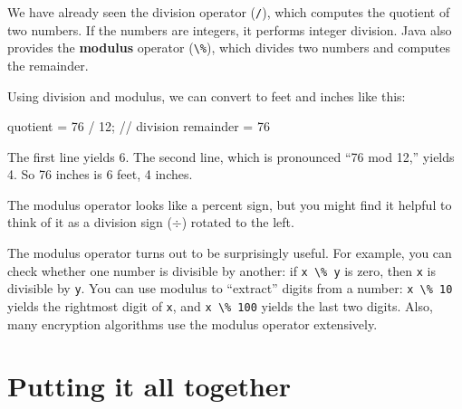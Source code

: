 \documentclass[12pt]{book}
\theoremstyle{exercise}
\newcommand{\java}[1]{\verb"#1"}
\begin{document}

We have already seen the division operator (\java{/}), which computes the quotient of two numbers.
If the numbers are integers, it performs integer division.
Java also provides the {\bf modulus} operator (\java{\%}), which divides two numbers and computes the remainder.

Using division and modulus, we can convert to feet and inches like this:

\begin{code}
    quotient = 76 / 12;   // division
    remainder = 76 %
\end{code}

The first line yields 6.
The second line, which is pronounced ``76 mod 12,'' yields 4.
So 76 inches is 6 feet, 4 inches.

The modulus operator looks like a percent sign, but you might find it helpful to think of it as a division sign ($\div$) rotated to the left.



The modulus operator turns out to be surprisingly useful.
For example, you can check whether one number is divisible by another: if \java{x \% y} is zero, then \java{x} is divisible by \java{y}.
You can use modulus to ``extract'' digits from a number: \java{x \% 10} yields the rightmost digit of \java{x}, and \java{x \% 100} yields the last two digits.
Also, many encryption algorithms use the modulus operator extensively.


\section{Putting it all together}



\end{document}
